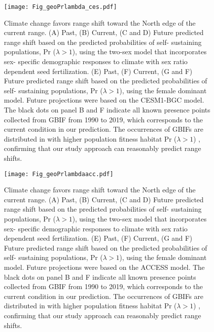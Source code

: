 \documentclass[9pt,twoside,lineno]{pnas-new}
\begin{document}
\begin{figure}
\centering
\texttt{[image: Fig\_geoPrlambda\_ces.pdf]}
\caption{Climate change favors range shift toward the North edge of the current range.
			(A) Past, (B) Current, (C and D) Future predicted range shift based on the predicted probabilities of self- sustaining populations, Pr ($\lambda > 1$), using the two-sex model that incorporates sex- specific demographic responses to climate with sex ratio dependent seed fertilization.
			(E) Past, (F) Current, (G and F) Future  predicted range shift based on the predicted probabilities of self- sustaining populations, Pr ($\lambda > 1$), using the female dominant model.
			Future projections were based on the CESM1-BGC model.
			The black dots on panel B and F indicate all known presence points collected from GBIF from 1990 to 2019, which corresponds to the current condition in our prediction. 
			The occurrences of GBIFs are distributed in with higher population fitness habitat Pr ($\lambda > 1$) , confirming that our study approach can reasonably predict range shifts. }
\label{Sup:geoprojces}
\end{figure}
\clearpage


\begin{figure}
\centering
\texttt{[image: Fig\_geoPrlambdaacc.pdf]}
\caption{Climate change favors range shift toward the North edge of the current range.
			(A) Past, (B) Current, (C and D) Future predicted range shift based on the predicted probabilities of self- sustaining populations, Pr ($\lambda > 1$), using the two-sex model that incorporates sex- specific demographic responses to climate with sex ratio dependent seed fertilization.
			(E) Past, (F) Current, (G and F) Future  predicted range shift based on the predicted probabilities of self- sustaining populations, Pr ($\lambda > 1$), using the female dominant model.
			Future projections were based on the  ACCESS model.
			The black dots on panel B and F indicate all known presence points collected from GBIF from 1990 to 2019, which corresponds to the current condition in our prediction. 
			The occurrences of GBIFs are distributed in with higher population fitness habitat Pr ($\lambda > 1$) , confirming that our study approach can reasonably predict range shifts.}
\label{Sup:geoprojacc}
\end{figure}
\clearpage
\end{document}
